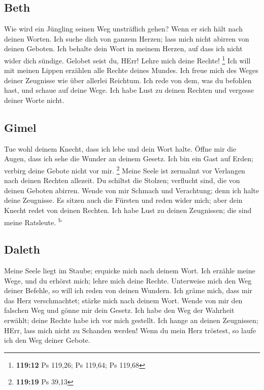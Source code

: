 \hypertarget{beth}{%
\subsection{Beth}\label{beth}}

 Wie wird ein Jüngling seinen Weg unsträflich gehen? Wenn
er sich hält nach deinen Worten.  Ich suche dich von
ganzem Herzen; lass mich nicht abirren von deinen Geboten.
 Ich behalte dein Wort in meinem Herzen, auf dass ich
nicht wider dich sündige.  Gelobet seist du, HErr! Lehre
mich deine Rechte! \footnote{\textbf{119:12} Ps 119,26; Ps 119,64; Ps
  119,68}  Ich will mit meinen Lippen erzählen alle
Rechte deines Mundes.  Ich freue mich des Weges deiner
Zeugnisse wie über allerlei Reichtum.  Ich rede von dem,
was du befohlen hast, und schaue auf deine Wege.  Ich
habe Lust zu deinen Rechten und vergesse deiner Worte nicht.

\hypertarget{gimel}{%
\subsection{Gimel}\label{gimel}}

 Tue wohl deinem Knecht, dass ich lebe und dein Wort
halte.  Öffne mir die Augen, dass ich sehe die Wunder an
deinem Gesetz.  Ich bin ein Gast auf Erden; verbirg deine
Gebote nicht vor mir. \footnote{\textbf{119:19} Ps 39,13}
 Meine Seele ist zermalmt vor Verlangen nach deinen
Rechten allezeit.  Du schiltst die Stolzen; verflucht
sind, die von deinen Geboten abirren.  Wende von mir
Schmach und Verachtung; denn ich halte deine Zeugnisse. 
Es sitzen auch die Fürsten und reden wider mich; aber dein Knecht redet
von deinen Rechten.  Ich habe Lust zu deinen Zeugnissen;
die sind meine Ratsleute. \textsuperscript{b}

\hypertarget{daleth}{%
\subsection{Daleth}\label{daleth}}

 Meine Seele liegt im Staube; erquicke mich nach deinem
Wort.  Ich erzähle meine Wege, und du erhörst mich; lehre
mich deine Rechte.  Unterweise mich den Weg deiner
Befehle, so will ich reden von deinen Wundern.  Ich gräme
mich, dass mir das Herz verschmachtet; stärke mich nach deinem Wort.
 Wende von mir den falschen Weg und gönne mir dein
Gesetz.  Ich habe den Weg der Wahrheit erwählt; deine
Rechte habe ich vor mich gestellt.  Ich hange an deinen
Zeugnissen; HErr, lass mich nicht zu Schanden werden! 
Wenn du mein Herz tröstest, so laufe ich den Weg deiner Gebote.

